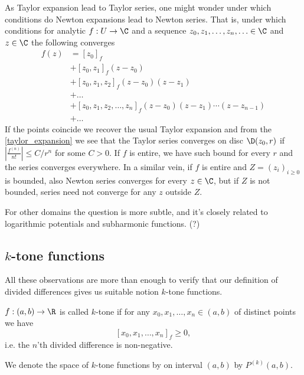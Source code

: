 \begin{huom}
	As Taylor expansion lead to Taylor series, one might wonder under which conditions do Newton expansions lead to Newton series. That is, under which conditions for analytic $f : U \to \C$ and a sequence $z_{0}, z_{1}, \ldots, z_{n}, \ldots \in \C$ and $z \in \C$ the following converges
	\begin{align*}
		f(z) &= [z_{0}]_{f} \\
		&+ [z_{0}, z_{1}]_{f} (z - z_{0})\\
		&+ [z_{0}, z_{1}, z_{2}]_{f} (z - z_{0}) (z - z_{1}) \\
		&+ \ldots \\
		&+ [z_{0}, z_{1}, z_{2}, \ldots, z_{n}]_{f} (z - z_{0}) (z - z_{1}) \cdots (z - z_{n - 1}) \\
		&+ \ldots
	\end{align*}
	If the points coincide we recover the usual Taylor expansion and from the \ref{taylor_expansion} we see that the Taylor series converges on disc $\D(z_{0}, r)$ if $\left|\frac{f^{(n)}}{n!}\right| \leq C/r^{n}$ for some $C > 0$. If $f$ is entire, we have such bound for every $r$ and the series converges everywhere. In a similar vein,
	if $f$ is entire and $Z = (z_{i})_{i \geq 0}$ is bounded, also Newton series converges for every $z \in \C$, but if $Z$ is not bounded, series need not converge for any $z$ outside $Z$.

	For other domains the question is more subtle, and it's closely related to logarithmic potentials and subharmonic functions. (?)
\end{huom}

\subsection{$k$-tone functions}

All these observations are more than enough to verify that our definition of divided differences gives us suitable notion $k$-tone functions.

\begin{maar}
	$f : (a, b) \to \R$ is called $k$-tone if for any $x_{0}, x_{1}, \ldots, x_{n} \in (a, b)$ of distinct points we have
	\[
		[x_{0}, x_{1}, \ldots, x_{n}]_{f} \geq 0,
	\]
	i.e. the $n$'th divided difference is non-negative.
\end{maar}

We denote the space of $k$-tone functions by on interval $(a, b)$ by $P^{(k)}(a, b)$.

